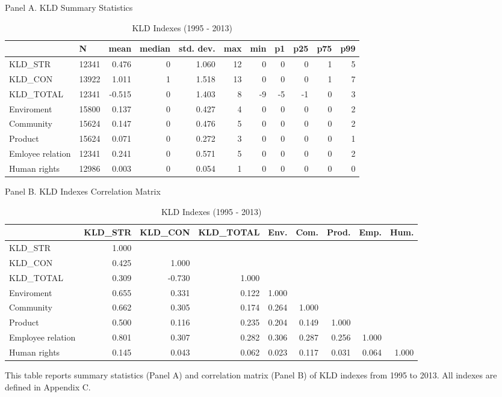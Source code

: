 \begin{table}[H]
	\centering
	\caption{KLD Indexes (1995 - 2013)}
	
	Panel A. KLD Summary Statistics
	\begin{tabular}{lrrrrrrrrrr}
		\toprule
		\toprule
		& \multicolumn{1}{l}{N} & \multicolumn{1}{l}{mean} & \multicolumn{1}{l}{median} & \multicolumn{1}{l}{std. dev.} & \multicolumn{1}{l}{max} & \multicolumn{1}{l}{min} & \multicolumn{1}{l}{p1} & \multicolumn{1}{l}{p25} & \multicolumn{1}{l}{p75} & \multicolumn{1}{l}{p99} \\
		\midrule
		KLD\_STR & 12341 & 0.476 & 0     & 1.060 & 12    & 0     & 0     & 0     & 1     & 5 \\
		KLD\_CON & 13922 & 1.011 & 1     & 1.518 & 13    & 0     & 0     & 0     & 1     & 7 \\
		KLD\_TOTAL & 12341 & -0.515 & 0     & 1.403 & 8     & -9    & -5    & -1    & 0     & 3 \\
		Enviroment & 15800 & 0.137 & 0     & 0.427 & 4     & 0     & 0     & 0     & 0     & 2 \\
		Community & 15624 & 0.147 & 0     & 0.476 & 5     & 0     & 0     & 0     & 0     & 2 \\
		Product & 15624 & 0.071 & 0     & 0.272 & 3     & 0     & 0     & 0     & 0     & 1 \\
		Emloyee relation & 12341 & 0.241 & 0     & 0.571 & 5     & 0     & 0     & 0     & 0     & 2 \\
		Human rights & 12986 & 0.003 & 0     & 0.054 & 1     & 0     & 0     & 0     & 0     & 0 \\
		\bottomrule
		\bottomrule
	\end{tabular}%
	
	\bigbreak
	Panel B. KLD Indexes Correlation Matrix
	\begin{tabular}{lrrrrrrrr}
		\toprule
		\toprule
		& KLD\_STR & KLD\_CON & KLD\_TOTAL & Env. & Com. & Prod. & Emp. & Hum.\\
		\midrule
		KLD\_STR & 1.000 &       &       &       &       &       &       &  \\
		KLD\_CON & 0.425 & 1.000 &       &       &       &       &       &  \\
		KLD\_TOTAL & 0.309 & -0.730 & 1.000 &       &       &       &       &  \\
		Enviroment & 0.655 & 0.331 & 0.122 & 1.000 &       &       &       &  \\
		Community & 0.662 & 0.305 & 0.174 & 0.264 & 1.000 &       &       &  \\
		Product & 0.500 & 0.116 & 0.235 & 0.204 & 0.149 & 1.000 &       &  \\
		Employee relation & 0.801 & 0.307 & 0.282 & 0.306 & 0.287 & 0.256 & 1.000 &  \\
		Human rights & 0.145 & 0.043 & 0.062 & 0.023 & 0.117 & 0.031 & 0.064 & 1.000 \\
		\bottomrule
		\bottomrule
	\end{tabular}%
\end{table}%
\noindent This table reports summary statistics (Panel A) and correlation matrix (Panel B) of KLD indexes from 1995 to 2013. All indexes are defined in Appendix C.

